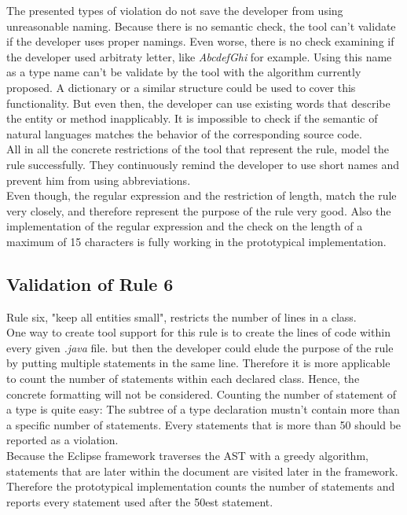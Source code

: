 The presented types of violation do not save the developer from using unreasonable naming. Because there is no semantic check, the tool can't validate if the developer uses proper namings. Even worse, there is no check examining if the developer used arbitraty letter, like \textit{AbcdefGhi} for example. Using this name as a type name can't be validate by the tool with the algorithm currently proposed. A dictionary or a similar structure could be used to cover this functionality. But even then, the developer can use existing words that describe the entity or method inapplicably. It is impossible to check if the semantic of natural languages matches the behavior of the corresponding source code.
\\

All in all the concrete restrictions of the tool that represent the rule, model the rule successfully. They continuously remind the developer to use short names and prevent him from using abbreviations. 
\\

Even though, the regular expression and the restriction of length, match the rule very closely, and therefore represent the purpose of the rule very good. Also the implementation of the regular expression and the check on the length of a maximum of 15 characters is fully working in the prototypical implementation.


\subsection*{Validation of Rule 6}
Rule six, "keep all entities small", restricts the number of lines in a class.
\\

One way to create tool support for this rule is to create the lines of code within every given \textit{.java} file. but then the developer could elude the purpose of the rule by putting multiple statements in the same line. Therefore it is more applicable to count the number of statements within each declared class. Hence, the concrete formatting will not be considered. Counting the number of statement of a type is quite easy: The subtree of a type declaration mustn't contain more than a specific number of statements. Every statements that is more than 50 should be reported as a violation. 
\\

Because the Eclipse framework traverses the \ac{AST} with a greedy algorithm, statements that are later within the document are visited later in the framework. Therefore the prototypical implementation counts the number of statements and reports every statement used after the 50est statement.
\\

